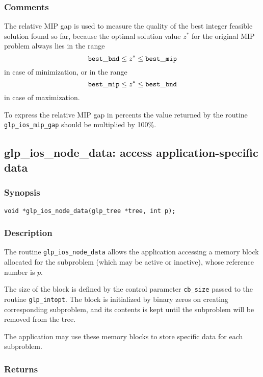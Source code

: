 \subsubsection*{Comments}

The relative MIP gap is used to measure the quality of the best integer
feasible solution found so far, because the optimal solution value
$z^*$ for the original MIP problem always lies in the range
$${\tt best\_bnd}\leq z^*\leq{\tt best\_mip}$$
in case of minimization, or in the range
$${\tt best\_mip}\leq z^*\leq{\tt best\_bnd}$$
in case of maximization.

To express the relative MIP gap in percents the value returned by the
routine \verb|glp_ios_mip_gap| should be multiplied by 100\%.

\newpage

\subsection{glp\_ios\_node\_data: access application-specific data}

\subsubsection*{Synopsis}

\begin{verbatim}
void *glp_ios_node_data(glp_tree *tree, int p);
\end{verbatim}

\subsubsection*{Description}

The routine \verb|glp_ios_node_data| allows the application accessing a
memory block allocated for the subproblem (which may be active or
inactive), whose reference number is $p$.

The size of the block is defined by the control parameter \verb|cb_size|
passed to the routine \verb|glp_intopt|. The block is initialized by
binary zeros on creating corresponding subproblem, and its contents is
kept until the subproblem will be removed from the tree.

The application may use these memory blocks to store specific data for
each subproblem.

\subsubsection*{Returns}

